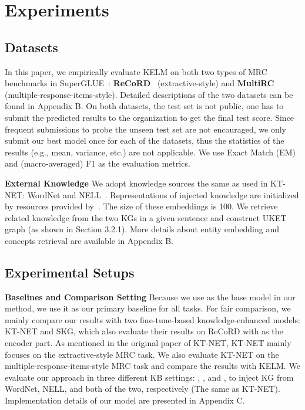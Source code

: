 \documentclass{article} \usepackage{iclr2022_conference,times}
\begin{document}
\section{Experiments}
\subsection{Datasets}
In this paper, we empirically evaluate KELM on both two types of MRC benchmarks in SuperGLUE~\citep{wang2020superglue}: \textbf{ReCoRD}~\citep{zhang2018record} (extractive-style) and \textbf{MultiRC}~\citep{MultiRC2018} (multiple-response-items-style). Detailed descriptions of the two datasets can be found in Appendix B. On both datasets, the test set is not public, one has to submit the predicted results to the organization to get the final test score. Since frequent submissions to probe the unseen test set are not encouraged, we only submit our best model once for each of the datasets, thus the statistics of the results (e.g., mean, variance, etc.) are not applicable. We use Exact Match (EM) and (macro-averaged) F1 as the evaluation metrics.



\noindent\textbf{External Knowledge} We adopt knowledge sources the same as used in KT-NET: WordNet and NELL~\citep{Carlson10}. Representations of injected knowledge are initialized by resources provided by~\citep{yang-mitchell-2017-leveraging}. The size of these embeddings is 100. We retrieve related knowledge from the two KGs in a given sentence and construct UKET graph (as shown in Section 3.2.1). More details about entity embedding and concepts retrieval are available in Appendix B.

\subsection{Experimental Setups}

\textbf{Baselines and Comparison Setting} 
Because we use  as the base model in our method, we use it as our primary baseline for all tasks. 
For fair comparison, we mainly compare our results with two fine-tune-based knowledge-enhanced models: KT-NET and SKG, which also evaluate their results on ReCoRD with \textbf{} as the encoder part. 
As mentioned in the original paper of KT-NET, KT-NET mainly focuses on the extractive-style MRC task. We also evaluate KT-NET on the multiple-response-items-style MRC task and compare the results with KELM.
We evaluate our approach in three different KB settings: , , and , to inject KG from WordNet, NELL, and both of the two, respectively (The same as KT-NET). 
Implementation details of our model are presented in Appendix C.
\end{document}
